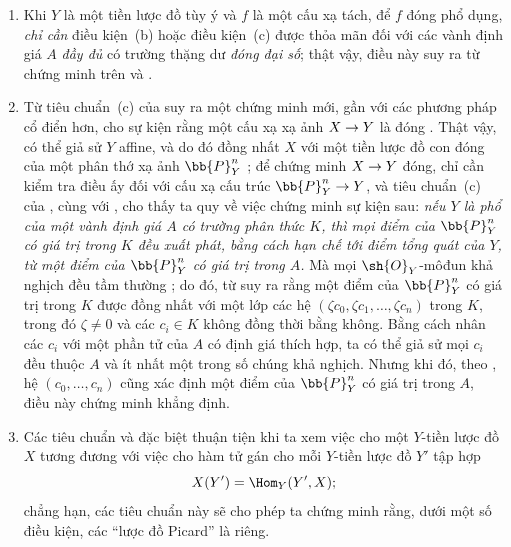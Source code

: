 \documentclass[oneside,10pt]{amsart}
\makeatletter
\newcommand{\ega@arrow}[2]{\mathchoice{#1}{#2}{#2}{#2}}
\renewcommand{\to}{\ega@arrow{\longrightarrow}{\rightarrow}}
\newcommand{\oldpage}[2][]{\marginnote{\normalfont\footnotesize\textbf{#1}~|~#2}\ignorespaces}
\let\EGAOriginalLabel\label
\renewcommand{\label}[1]{\phantomsection\EGAOriginalLabel{#1}}
\makeatother
\begin{document}
\begin{remarks}[7.3.9]
\label{II.7.3.9}
\begin{enumerate}
  \item[\rm{(i)}] Khi $Y$ là một tiền lược đồ tùy ý và $f$ là một cấu xạ tách, để $f$ đóng phổ dụng, \emph{chỉ cần} điều kiện~(b) hoặc điều kiện~(c) được thỏa mãn đối với các vành định giá $A$ \emph{đầy đủ} có trường thặng dư \emph{đóng đại số};
  thật vậy, điều này suy ra từ chứng minh trên và .

  \item[\rm{(ii)}] Từ tiêu chuẩn~(c) của  suy ra một chứng minh mới, gần với các phương pháp cổ điển hơn, cho sự kiện rằng một cấu xạ xạ ảnh $X\to Y$ là đóng .
  Thật vậy, có thể giả sử $Y$ affine, và do đó đồng nhất $X$ với một tiền lược đồ con đóng của một phân thớ xạ ảnh $\bb{P}_Y^n$ ;
  để chứng minh $X\to Y$ đóng, chỉ cần kiểm tra điều ấy đối với cấu xạ cấu trúc $\bb{P}_Y^n\to Y$, và tiêu chuẩn~(c) của , cùng với , cho thấy ta quy về việc chứng minh sự kiện sau:
  \emph{nếu $Y$ là phổ của một vành định giá $A$ có trường phân thức $K$, thì mọi điểm của $\bb{P}_Y^n$ có giá trị trong $K$ đều xuất phát, bằng cách hạn chế tới điểm tổng quát của $Y$, từ một điểm của $\bb{P}_Y^n$ có giá trị trong $A$.}
  Mà mọi $\sh{O}_Y$-môđun khả nghịch đều tầm thường ;
  do đó, từ  suy ra rằng một điểm của $\bb{P}_Y^n$ có giá trị trong $K$ được đồng nhất với một lớp các hệ $(\zeta c_0,\zeta c_1,\ldots,\zeta c_n)$ trong $K$, trong đó $\zeta\ne0$ và các $c_i\in K$ không đồng thời bằng không.
  Bằng cách nhân các $c_i$ với một phần tử của $A$ có
\oldpage[II]{146}
  định giá thích hợp, ta có thể giả sử mọi $c_i$ đều thuộc $A$ và ít nhất một trong số chúng khả nghịch.
  Nhưng khi đó, theo , hệ $(c_0,\ldots,c_n)$ cũng xác định một điểm của $\bb{P}_Y^n$ có giá trị trong $A$, điều này chứng minh khẳng định.

  \item[\rm{(iii)}] Các tiêu chuẩn  và  đặc biệt thuận tiện khi ta xem việc cho một $Y$-tiền lược đồ $X$ tương đương với việc cho hàm tử gán cho mỗi $Y$-tiền lược đồ $Y'$ tập hợp
  \[
    X(Y')=\Hom_Y(Y',X);
  \]
  chẳng hạn, các tiêu chuẩn này sẽ cho phép ta chứng minh rằng, dưới một số điều kiện, các ``lược đồ Picard'' là riêng.
\end{enumerate}
\end{remarks}
\end{document}
